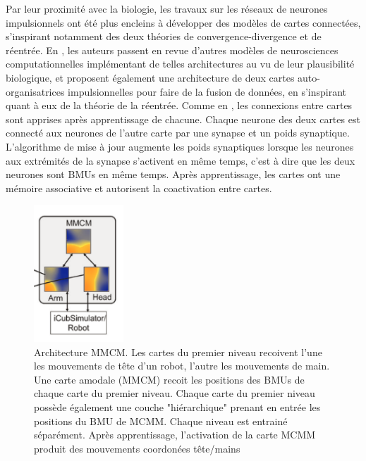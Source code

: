 \documentclass[../main]{subfiles}
\begin{document}
Par leur proximité avec la biologie, les travaux sur les réseaux de neurones impulsionnels ont été plus encleins à développer des modèles de cartes connectées, s'inspirant notamment des deux théories de convergence-divergence et de réentrée.
En \cite{khacef_brain-inspired_2020}, les auteurs passent en revue d'autres modèles de neurosciences computationnelles implémentant de telles architectures au vu de leur plausibilité biologique, et proposent également une architecture de deux cartes auto-organisatrices impulsionnelles pour faire de la fusion de données, en s'inspirant quant à eux de la théorie de la réentrée.
Comme en \cite{dominey13}, les connexions entre cartes sont apprises après apprentissage de chacune. Chaque neurone des deux cartes est connecté aux neurones de l'autre carte par une synapse et un poids synaptique. L'algorithme de mise à jour augmente les poids synaptiques lorsque les neurones aux extrémités de la synapse s'activent en même temps, c'est à dire que les deux neurones sont BMUs en même temps. Après apprentissage, les cartes ont une mémoire associative et autorisent la coactivation entre cartes.

\begin{figure}
    \centering
    \includegraphics[width=0.3\textwidth]{MMCM_schema.pdf}
    \caption{Architecture MMCM. Les cartes du premier niveau recoivent l'une les mouvements de tête d'un robot, l'autre les mouvements de main. 
    Une carte amodale (MMCM) recoit les positions des BMUs de chaque carte du premier niveau. Chaque carte du premier niveau possède également une couche "hiérarchique" prenant en entrée les positions du BMU de MCMM. Chaque niveau est entrainé séparément.
    Après apprentissage, l'activation de la carte MCMM produit des mouvements coordonées tête/mains~\cite{dominey13}\label{fig:mmcm}}
\end{figure}
\end{document}
